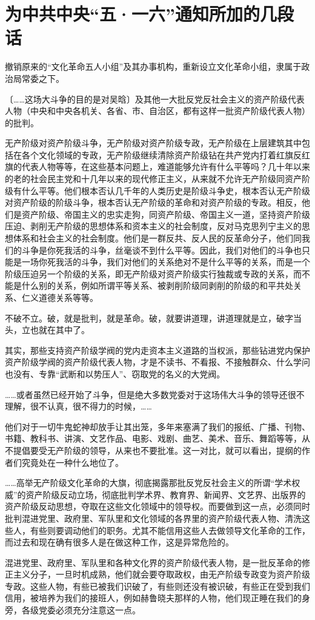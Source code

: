 \section[为中共中央“五·一六”通知所加的几段话（一九六六年五月十六日）]{为中共中央“五·一六”通知所加的几段话}


撤销原来的“文化革命五人小组”及其办事机构，重新设立文化革命小组，隶属于政治局常委之下。

〔……这场大斗争的目的是对吴晗〕及其他一大批反党反社会主义的资产阶级代表人物（中央和中央各机关、各省、市、自治区，都有这样一批资产阶级代表人物）的批判。

无产阶级对资产阶级斗争，无产阶级对资产阶级专政，无产阶级在上层建筑其中包括在各个文化领域的专政，无产阶级继续清除资产阶级钻在共产党内打着红旗反红旗的代表人物等等，在这些基本问题上，难道能够允许有什么平等吗？几十年以来的老的社会民主党和十几年以来的现代修正主义，从来就不允许无产阶级同资产阶级有什么平等。他们根本否认几千年的人类历史是阶级斗争史，根本否认无产阶级对资产阶级的阶级斗争，根本否认无产阶级的革命和对资产阶级的专政。相反，他们是资产阶级、帝国主义的忠实走狗，同资产阶级、帝国主义一道，坚持资产阶级压迫、剥削无产阶级的思想体系和资本主义的社会制度，反对马克思列宁主义的思想体系和社会主义的社会制度。他们是一群反共、反人民的反革命分子，他们同我们的斗争是你死我活的斗争，丝毫谈不到什么平等。因此，我们对他们的斗争也只能是一场你死我活的斗争，我们对他们的关系绝对不是什么平等的关系，而是一个阶级压迫另一个阶级的关系，即无产阶级对资产阶级实行独裁或专政的关系，而不能是什么别的关系，例如所谓平等关系、被剥削阶级同剥削的阶级的和平共处关系、仁义道德关系等等。

不破不立。破，就是批判，就是革命。破，就要讲道理，讲道理就是立，破字当头，立也就在其中了。

其实，那些支持资产阶级学阀的党内走资本主义道路的当权派，那些钻进党内保护资产阶级学阀的资产阶级代表人物，才是不读书、不看报、不接触群众、什么学问也没有、专靠“武断和以势压人”、窃取党的名义的大党阀。

……或者虽然已经开始了斗争，但是绝大多数党委对于这场伟大斗争的领导还很不理解，很不认真，很不得力的时候，……

他们对于一切牛鬼蛇神却放手让其出笼，多年来塞满了我们的报纸、广播、刊物、书籍、教科书、讲演、文艺作品、电影、戏剧、曲艺、美术、音乐、舞蹈等等，从不提倡要受无产阶级的领导，从来也不要批准。这一对比，就可以看出，提纲的作者们究竟处在一种什么地位了。

……高举无产阶级文化革命的大旗，彻底揭露那批反党反社会主义的所谓“学术权威”的资产阶级反动立场，彻底批判学术界、教育界、新闻界、文艺界、出版界的资产阶级反动思想，夺取在这些文化领域中的领导权。而要做到这一点，必须同时批判混进党里、政府里、军队里和文化领域的各界里的资产阶级代表人物、清洗这些人，有些则要调动他们的职务。尤其不能信用这些人去做领导文化革命的工作，而过去和现在确有很多人是在做这种工作，这是异常危险的。

混进党里、政府里、军队里和各种文化界的资产阶级代表人物，是一批反革命的修正主义分子，一旦时机成熟，他们就会要夺取政权，由无产阶级专政变为资产阶级专政。这些人物，有些已被我们识破了，有些则还没有被识破，有些正在受到我们信用，被培养为我们的接班人，例如赫鲁晓夫那样的人物，他们现正睡在我们的身旁，各级党委必须充分注意这一点。

